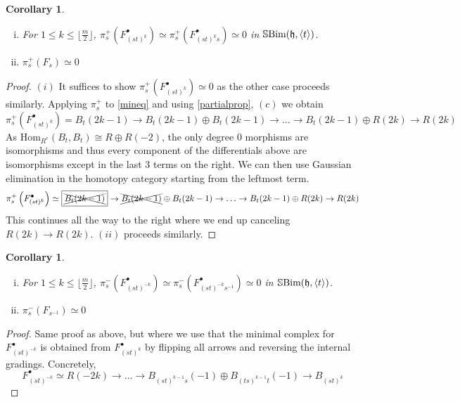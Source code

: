 \documentclass[10pt]{article}
\numberwithin{theorem}{section}
\newtheorem{corollary}[theorem]{Corollary}
\theoremstyle{definition}
\renewcommand{\hom}{\mathrm{Hom}}
\newcommand{\hf}{\mathfrak{h}}
\newcommand{\sbim}{\mathbb{S}\textnormal{Bim}}
\newcommand{\abrac}[1]{\left\langle#1\right\rangle}
\newcommand{\paren}[1]{\left( #1 \right)}
\newcommand{\0}{\ \raisebox{-2ex}{\begin{tikzpicture}[xscale=0.25,yscale=0.3,thick,baseline]
 \draw (0,0) -- (0,3); 
\end{tikzpicture}}}
\renewcommand{\1}{\ \raisebox{-2ex}{\begin{tikzpicture}[xscale=0.25,yscale=0.3,thick,baseline]
 \draw (0,0) -- (0,1);
 \draw (0,2) -- (0,3);
 \node[dot] at (0,1) {};
  \node[dot] at (0,2) {};
\end{tikzpicture}}}
\begin{document}
\begin{corollary}
\label{pis0}
\begin{enumerate}[(i)]
    \item  For $1\le k\le \lfloor\frac{m}{2}\rfloor$,  $\pi^+_s\paren{F^\bullet_{(st)^k}}\simeq \pi^+_s\paren{F^\bullet_{(st)^ks}}\simeq 0$ in $\sbim(\hf, \abrac{t} )$.
    \item $\pi^+_s\paren{F_s}\simeq 0$
\end{enumerate}
\end{corollary}
\begin{proof}
    $(i)$ It suffices to show $\pi^+_s\paren{F^\bullet_{(st)^k}}\simeq 0$ as the other case proceeds similarly. Applying $\pi^+_s$ to \cref{mineq} and using \cref{partialprop}, $(c)$ we obtain 
    \[\pi^+_s\paren{F^\bullet_{(st)^k}}=\boxed{B_t(2k-1)}\to B_t(2k-1)\oplus B_t(2k-1)\to \ldots \to B_t(2k-1)\oplus R(2k) \to R(2k) \]
    As $\hom_{R^e}(B_t, B_t)\cong R\oplus R(-2)$, the only degree 0 morphisms are isomorphisms and thus every component of the differentials above are isomorphisms except in the last 3 terms on the right. We can then use Gaussian elimination in the homotopy category starting from the leftmost term.
    \[\pi^+_s\paren{F^\bullet_{(st)^k}}\simeq\boxed{\xcancel{B_t(2k-1)}}\to \xcancel{B_t(2k-1)}\oplus B_t(2k-1)\to \ldots \to B_t(2k-1)\oplus R(2k) \to R(2k) \]
    This continues all the way to the right where we end up canceling $R(2k)\to R(2k)$. $(ii)$ proceeds similarly.
\end{proof}

\begin{corollary}
\label{negpis0}
\begin{enumerate}[(i)]
    \item  For $1\le k\le \lfloor\frac{m}{2}\rfloor$,  $\pi^-_s\paren{F^\bullet_{(st)^{-k}}}\simeq \pi^-_s\paren{F^\bullet_{(st)^{-k}s^{-1}}}\simeq 0$ in $\sbim(\hf, \abrac{t} )$.
    \item $\pi^-_s\paren{F_{s^{-1}}}\simeq 0$
\end{enumerate}
\end{corollary}
\begin{proof}
    Same proof as above, but where we use that the minimal complex for $F^\bullet_{(st)^{-k}}$ is obtained from $F^\bullet_{(st)^{k}}$ by flipping all arrows and reversing the internal gradings. Concretely,
    \begin{equation}
    \label{negmineq}
       F^\bullet_{(st)^{-k}}\simeq R(-2k)\to \ldots  \xrightarrow{} B_{(st)^{k-1}s}(-1) \oplus B_{(ts)^{k-1}t}(-1) \xrightarrow{}  \boxed{B_{(st)^k}}
    \end{equation}
\end{proof}
\end{document}
